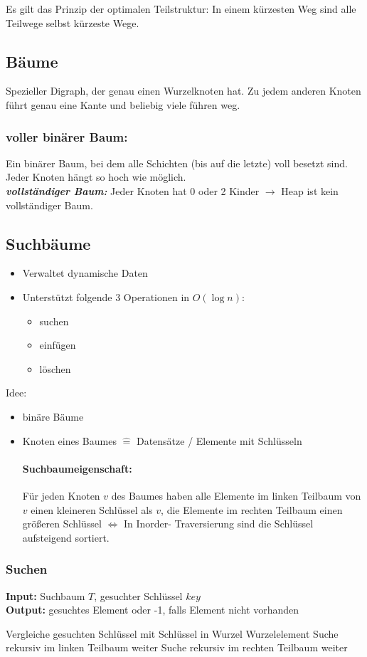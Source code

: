 \documentclass[fleqn]{scrartcl}
\begin{document}
Es gilt das Prinzip der optimalen Teilstruktur: In einem kürzesten Weg sind alle Teilwege selbst kürzeste Wege.

\subsection{Bäume}
Spezieller Digraph, der genau einen Wurzelknoten hat.
Zu jedem anderen Knoten führt genau eine Kante und beliebig viele führen weg.
\subsubsection{voller binärer Baum:} Ein binärer Baum, bei dem alle Schichten (bis auf die letzte) voll besetzt sind. \glqq Jeder Knoten hängt so hoch wie möglich.\grqq\\
\textbf{\textit{vollständiger Baum:}} Jeder Knoten hat 0 oder 2 Kinder $\rightarrow$ Heap ist kein vollständiger Baum.

\subsection{Suchbäume}
\begin{itemize}
\item Verwaltet dynamische Daten
\item Unterstützt folgende 3 Operationen in $O (\log n)$:
\begin{itemize}
\item suchen
\item einfügen
\item löschen
\end{itemize}
\end{itemize}

Idee:
\begin{itemize}
\item binäre Bäume
\item Knoten eines Baumes $\widehat{=}$ Datensätze / Elemente mit Schlüsseln

\paragraph*{Suchbaumeigenschaft:}
Für jeden Knoten $v$ des Baumes haben alle Elemente im linken Teilbaum von $v$ einen kleineren Schlüssel als $v$, die Elemente im rechten Teilbaum einen größeren Schlüssel $\Leftrightarrow$ In Inorder- Traversierung sind die Schlüssel aufsteigend sortiert.
\end{itemize}

\subsubsection{Suchen}
\textbf{Input:} Suchbaum $T$, gesuchter Schlüssel $key$\\
\textbf{Output:} gesuchtes Element oder -1, falls Element nicht vorhanden
\begin{algorithmic}
\State Vergleiche gesuchten Schlüssel mit Schlüssel in Wurzel
\State \Return Wurzelelement
\Else {}
\State Suche rekursiv im linken Teilbaum weiter
\Else 
\State Suche rekursiv im rechten Teilbaum weiter
\EndIf
\EndIf
\State {}
\end{algorithmic}
\end{document}
